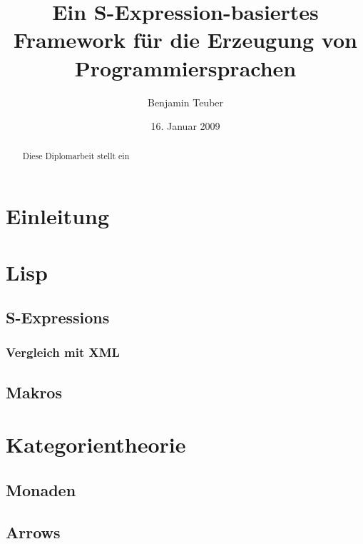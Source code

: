 \documentclass[a4paper, bibgerm]{article}
\begin{document}
\title{Ein S-Expression-basiertes Framework für die Erzeugung von Programmiersprachen}
\author{Benjamin Teuber}
\date{16. Januar 2009}

\maketitle

\begin{abstract}
  Diese Diplomarbeit stellt ein
\end{abstract}

\tableofcontents

\section{Einleitung}
\label{sec:intro}

\section{Lisp}
\label{sec:lisp}

\subsection{S-Expressions}
\label{sec:lisp:sexp}

\subsubsection{Vergleich mit XML}
\label{sec:lisp:sexp:xml}

\subsection{Makros}
\label{sec:lisp:macros}

\section{Kategorientheorie}
\label{sec:category}

\subsection{Monaden}
\label{sec:category:monads}

\subsection{Arrows}
\label{sec:category:arrows}
\end{document}
